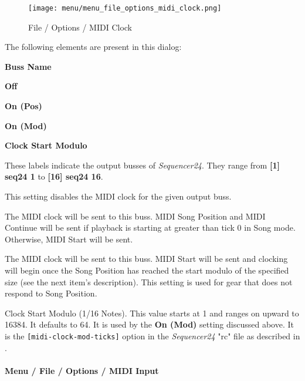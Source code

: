 \begin{figure}[H]
   \centering 
   \texttt{[image: menu/menu\_file\_options\_midi\_clock.png]}
   \caption{File / Options / MIDI Clock}
   \label{fig:seq24_menu_file_options_midi_clock}
\end{figure}

   The following elements are present in this dialog:

   \begin{enumber}
      \item \textbf{Buss Name}
      \item \textbf{Off}
      \item \textbf{On (Pos)}
      \item \textbf{On (Mod)}
      \item \textbf{Clock Start Modulo}
   \end{enumber}

   \setcounter{ItemCounter}{0}      %

   These labels indicate the output busses of \textsl{Sequencer24}.
   They range from \textbf{[1] seq24 1}
   to \textbf{[16] seq24 16}.

   This setting disables the MIDI clock for the given output buss.

   The MIDI clock will be sent to this buss.
   MIDI Song Position and MIDI Continue will be sent if playback is starting
   at greater than tick 0 in Song mode.  Otherwise, MIDI Start will be sent.

   The MIDI clock will be sent to this buss.
   MIDI Start will be sent and clocking will begin
   once the Song Position has reached the start modulo of the specified size
   (see the next item's description).
   This setting is used for gear that does not respond to Song Position.

   Clock Start Modulo (1/16 Notes).
   This value starts at 1 and ranges on upward to 16384.
   It  defaults to 64.
   It is used by the \textbf{On (Mod)} setting discussed above.
   It is the \texttt{[midi-clock-mod-ticks]} option in the \textsl{Sequencer24}
   "rc" file as described in
   .


\paragraph{Menu / File / Options / MIDI Input}
\label{paragraph:seq24_menu_file_options_midi_input}


